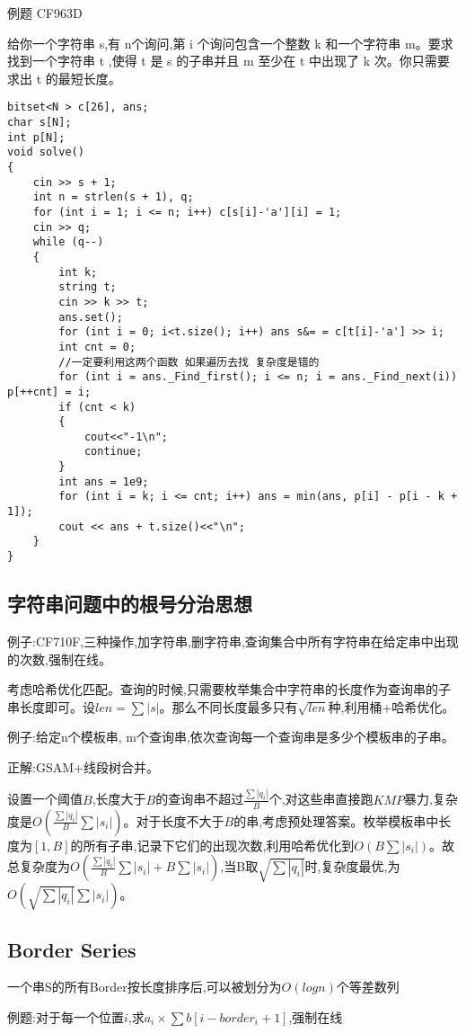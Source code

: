 \documentclass[a4paper, fontset=none]{ctexart}
\begin{document}
例题 CF963D

给你一个字符串 s,有 n个询问,第 i 个询问包含一个整数 k 和一个字符串 m。要求找到一个字符串 t ,使得 t 是 s 的子串并且 m 至少在 t 中出现了 k 次。你只需要求出 t 的最短长度。

\begin{verbatim}
bitset<N > c[26], ans;
char s[N];
int p[N];
void solve()
{
    cin >> s + 1;
    int n = strlen(s + 1), q;
    for (int i = 1; i <= n; i++) c[s[i]-'a'][i] = 1;
    cin >> q;
    while (q--)
    {
        int k;
        string t;
        cin >> k >> t;
        ans.set();
        for (int i = 0; i<t.size(); i++) ans s&= = c[t[i]-'a'] >> i;
        int cnt = 0;
        //一定要利用这两个函数 如果遍历去找 复杂度是错的
        for (int i = ans._Find_first(); i <= n; i = ans._Find_next(i)) p[++cnt] = i;
        if (cnt < k)
        {
            cout<<"-1\n";
            continue;
        }
        int ans = 1e9;
        for (int i = k; i <= cnt; i++) ans = min(ans, p[i] - p[i - k + 1]);
        cout << ans + t.size()<<"\n";
    }
}
\end{verbatim}
\subsection{字符串问题中的根号分治思想}

例子:CF710F,三种操作,加字符串,删字符串,查询集合中所有字符串在给定串中出现的次数,强制在线。

考虑哈希优化匹配。查询的时候,只需要枚举集合中字符串的长度作为查询串的子串长度即可。设$len=\sum|s|$。那么不同长度最多只有$\sqrt{len}$种,利用桶+哈希优化。

例子:给定n个模板串, m个查询串,依次查询每一个查询串是多少个模板串的子串。

正解:GSAM+线段树合并。

设置一个阈值$B$,长度大于$B$的查询串不超过$\frac{\sum|q_i|}{B}$个,对这些串直接跑$KMP$暴力,复杂度是$O(\frac{\sum|q_i|}{B}\sum|s_i|)$。对于长度不大于$B$的串,考虑预处理答案。枚举模板串中长度为$[1, B]$的所有子串,记录下它们的出现次数,利用哈希优化到$O(B\sum|s_i|)$。故总复杂度为$O(\frac{\sum|q_i|}{B}\sum|s_i|+B\sum|s_i|)$,当B取$\sqrt{\sum|q_i|}$时,复杂度最优,为$O(\sqrt{\sum|q_i|}\sum|s_i|)$。
\subsection{Border Series}

一个串S的所有Border按长度排序后,可以被划分为$O(logn)$个等差数列

例题:对于每一个位置$i$,求$a_i\times \sum b[i-border_i+1]$,强制在线
\end{document}

